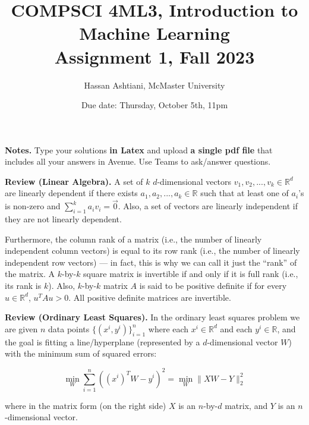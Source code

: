 \documentclass{article}
\title{COMPSCI 4ML3, Introduction to Machine Learning\\
Assignment 1, Fall 2023}
\author{Hassan Ashtiani, McMaster University}
\date{Due date: Thursday, October 5th, 11pm}
\begin{document}
\maketitle

{\bf Notes.} Type your solutions {\bf in Latex} and upload {\bf a single pdf file} that includes all your answers in Avenue. Use Teams to ask/answer questions. %

{\bf Review (Linear Algebra).} A set of $k$ $d$-dimensional vectors $v_1,v_2,...,v_k \in \mathbb{R}^d$ are linearly dependent if there exists $a_1, a_2, ..., a_k \in \mathbb{R}$ such that at least one of $a_i$'s is non-zero and $\sum_{i=1}^k a_iv_i=\vec{0}$. Also, a set of vectors are linearly independent if they are not linearly dependent.
    
Furthermore, the column rank of a matrix (i.e., the number of linearly independent column vectors) is equal to its row rank (i.e., the number of linearly independent row vectors) --- in fact, this is why we can call it just the ``rank'' of the matrix. A $k$-by-$k$ square matrix is invertible if and only if it is full rank (i.e., its rank is $k$). Also, $k$-by-$k$ matrix $A$ is said to be positive definite if for every $u\in \mathbb{R}^d$, $u^TAu>0$. All positive definite matrices are invertible.


{\bf Review (Ordinary Least Squares).} In the ordinary least squares problem we are given $n$ data points $\{(x^i, y^i)\}_{i=1}^n$ where each $x^i\in \mathbb{R}^d$ and each $y^i\in \mathbb{R}$, and the goal is fitting a line/hyperplane (represented by a $d$-dimensional vector $W$) with the minimum sum of squared errors:  

\[ 
\min_{W} \sum_{i=1}^n ((x^i)^TW - y^i)^2 =\min_{W} \|XW-Y\|_2^2 
\]

where in the matrix form (on the right side) $X$ is an $n$-by-$d$ matrix, and $Y$ is an $n$-dimensional vector.
\end{document}
